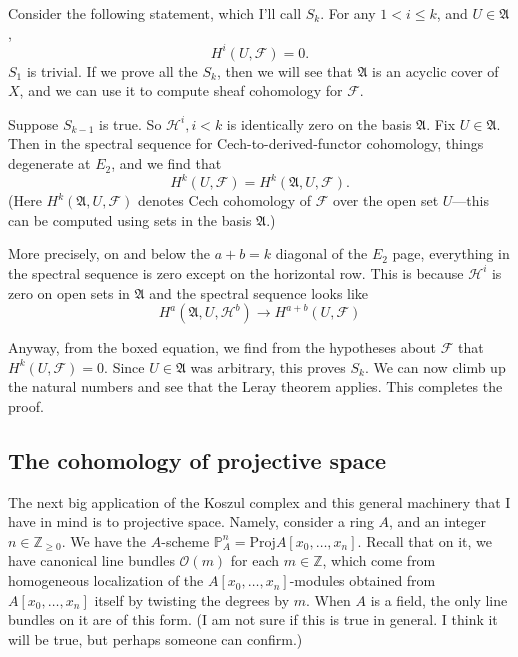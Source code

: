 \documentclass{article}
\begin{document}
Consider the following statement, which I'll call $S_k$. 
For any $1<i \leq  k$, and $U \in \mathfrak{A}$,
\[  H^i(U, \mathcal{F}) = 0 . \]
$S_1$ is trivial. If we prove all the $S_k$, then we will see that
$\mathfrak{A}$ is an acyclic cover of $X$, and we can use it to compute sheaf
cohomology for $\mathcal{F}$.

Suppose $S_{k-1}$ is true. So $\mathcal{H}^i, i < k$ is identically zero on 
the basis $\mathfrak{A}$. Fix $U \in \mathfrak{A}$.
Then in the spectral sequence for
Cech-to-derived-functor cohomology, things degenerate at $E_2$, and we find that
\[ \boxed{H^k(U, \mathcal{F}) = H^k(\mathfrak{A}, U, \mathcal{F}).}  \]
(Here $H^k(\mathfrak{A}, U, \mathcal{F})$ denotes Cech cohomology of
$\mathcal{F}$ over the open set $U$---this can be computed 
using sets in the basis $\mathfrak{A}$.)

More precisely, on and below the $a+b = k$ diagonal of the $E_2$ page,
everything in the spectral sequence is zero except on the horizontal row.
This is because $\mathcal{H}^i$ is zero on open sets in $\mathfrak{A}$ and the
spectral sequence looks like
\[ H^a(\mathfrak{A}, U, \mathcal{H}^b) \to H^{a+b}(U, \mathcal{F})  \]

Anyway, from the boxed equation, we find from the hypotheses about
$\mathcal{F}$ that $H^k(U, \mathcal{F})=0$. Since $U \in \mathfrak{A}$ was
arbitrary, this proves $S_k$. We can now climb up the natural numbers and see
that the Leray theorem applies. 
This completes the proof.


\newcommand{\proj}{\mathrm{Proj}}
\renewcommand{\P}{\mathbb{P}}
\renewcommand{\O}{\mathcal{O}}
\subsection{The cohomology of projective space}

The next big application of the Koszul complex and this general machinery that
I have in mind is to projective space. 
Namely, consider a ring $A$, and an integer $n \in \mathbb{Z}_{\geq 0}$. 
We have the $A$-scheme $\P^n_A = \mathrm{Proj} A[x_0, \dots, x_n]$. Recall that on it, we have
canonical line bundles $\mathcal{O}(m)$ for each $m \in \mathbb{Z}$, which come from
homogeneous localization of the $A[x_0, \dots, x_n]$-modules obtained from
$A[x_0, \dots, x_n]$ itself by twisting the degrees by $m$.
When $A$ is a field, the only line bundles on it are of
this form. 	(I am not sure if this is true in general. I think it will be true,
but perhaps someone can confirm.) 
\end{document}
